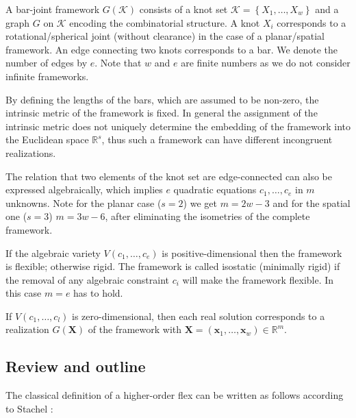 \documentclass{svproc}
\def\RR{{\mathbb R}}
\def\Vkt#1{{\mathbf #1}}
\begin{document}
A bar-joint framework $G(\mathcal{K})$ consists of a knot set $\mathcal{K}=\left\{X_{1},\ldots, X_w\right\}$
and a graph $G$  on $\mathcal{K}$ encoding the combinatorial structure. 
A knot $X_i$ corresponds to 
a rotational/spherical joint (without clearance) in the case of a planar/spatial framework. 
An edge connecting two knots corresponds to a bar. We denote the number of edges by $e$. Note that $w$ and $e$ are finite numbers as we do not consider infinite frameworks.



By defining the lengths of the bars, which are assumed to be non-zero,    
the intrinsic metric of the framework is fixed. 
In general the assignment of the intrinsic metric does not uniquely determine the embedding of the framework into the Euclidean space $\RR^s$, thus such a framework can have 
different incongruent realizations. 

The relation that two elements of the knot set are edge-connected can also be expressed algebraically, which implies $e$ quadratic equations $c_1,\ldots, c_e$ in $m$ unknowns. %
Note for the planar case ($s=2$) we get $m=2w-3$ and for the spatial one ($s=3$) $m=3w-6$, after eliminating the isometries of the complete framework.

If the algebraic variety  $V(c_1,\ldots,c_e)$ is positive-dimensional then the framework is flexible; otherwise rigid.  The framework is called isostatic (minimally rigid) if the removal of any algebraic constraint $c_i$ will make the framework flexible. 
In this case $m=e$ has to hold. 


If $V(c_1,\ldots ,c_l)$ is zero-dimensional, then each real solution corresponds to a realization $G(\Vkt X)$ of the framework with 
$\Vkt X=(\Vkt x_1,\ldots , \Vkt x_w)\in\RR^m$. 


\subsection{Review and outline}

The classical definition of a higher-order flex can be written as follows according to Stachel \cite{stachel_proposal}: 
\end{document}
